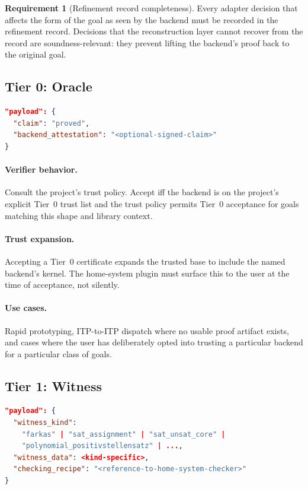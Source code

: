 \documentclass[11pt,letterpaper]{article}
\theoremstyle{definition}
\newtheorem{requirement}{Requirement}[section]
\theoremstyle{remark}
\begin{document}
\begin{requirement}[Refinement record completeness]
Every adapter decision that affects the form of the goal as seen by the
backend must be recorded in the refinement record. Decisions that the
reconstruction layer cannot recover from the record are soundness-relevant:
they prevent lifting the backend's proof back to the original goal.
\end{requirement}

\subsection{Tier 0: Oracle}

\begin{lstlisting}[language=json]
"payload": {
  "claim": "proved",
  "backend_attestation": "<optional-signed-claim>"
}
\end{lstlisting}

\paragraph{Verifier behavior.} Consult the project's trust policy.
Accept iff the backend is on the project's explicit Tier~0 trust list
and the trust policy permits Tier~0 acceptance for goals matching this
shape and library context.

\paragraph{Trust expansion.} Accepting a Tier~0 certificate expands the
trusted base to include the named backend's kernel. The home-system
plugin must surface this to the user at the time of acceptance, not
silently.

\paragraph{Use cases.} Rapid prototyping, ITP-to-ITP dispatch where
no usable proof artifact exists, and cases where the user has
deliberately opted into trusting a particular backend for a particular
class of goals.

\subsection{Tier 1: Witness}

\begin{lstlisting}[language=json]
"payload": {
  "witness_kind":
    "farkas" | "sat_assignment" | "sat_unsat_core" |
    "polynomial_positivstellensatz" | ...,
  "witness_data": <kind-specific>,
  "checking_recipe": "<reference-to-home-system-checker>"
}
\end{lstlisting}
\end{document}
